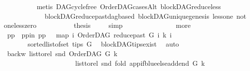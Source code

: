 \begin{isabellebody}
\ \ \ \ \ \ \ \ \isamarkupfalse%
\ {\isacharparenleft}{\kern0pt}metis\ DAG{\isachardot}{\kern0pt}cycle{\isacharunderscore}{\kern0pt}free\ OrderDAG{\isacharunderscore}{\kern0pt}casesAlt\ blockDAG{\isachardot}{\kern0pt}reduce{\isacharunderscore}{\kern0pt}less\isanewline
\ \ \ \ \ \ \ \ \ \ \ \ blockDAG{\isachardot}{\kern0pt}reduce{\isacharunderscore}{\kern0pt}past{\isacharunderscore}{\kern0pt}dagbased\ blockDAG{\isachardot}{\kern0pt}unique{\isacharunderscore}{\kern0pt}genesis\ less{\isacharunderscore}{\kern0pt}one\ not{\isacharunderscore}{\kern0pt}one{\isacharunderscore}{\kern0pt}less{\isacharunderscore}{\kern0pt}zero{\isacharparenright}{\kern0pt}\ \isanewline
\ \ \ \ \ \ \isamarkupfalse%
\ \isamarkupfalse%
\ {\isacharquery}{\kern0pt}thesis\ \isamarkupfalse%
\ {}\ \isamarkupfalse%
\ simp\isanewline
\ \ \ \ \isamarkupfalse%
\ \ \isanewline
\ \ \ \ \ \ \isamarkupfalse%
\ more\isanewline
\ \ \ \ \ \ \isamarkupfalse%
\ pp\ \ pp{\isacharunderscore}{\kern0pt}in{\isacharcolon}{\kern0pt}\ {\isachardoublequoteopen}pp\ {\isacharequal}{\kern0pt}\ \ {\isacharparenleft}{\kern0pt}map\ {\isacharparenleft}{\kern0pt}{\isasymlambda}i{\isachardot}{\kern0pt}\ {\isacharparenleft}{\kern0pt}OrderDAG\ {\isacharparenleft}{\kern0pt}reduce{\isacharunderscore}{\kern0pt}past\ G\ i{\isacharparenright}{\kern0pt}\ k{\isacharcomma}{\kern0pt}\ i{\isacharparenright}{\kern0pt}{\isacharparenright}{\kern0pt}\isanewline
\ \ \ \ \ \ \ {\isacharparenleft}{\kern0pt}sorted{\isacharunderscore}{\kern0pt}list{\isacharunderscore}{\kern0pt}of{\isacharunderscore}{\kern0pt}set\ {\isacharparenleft}{\kern0pt}tips\ G{\isacharparenright}{\kern0pt}{\isacharparenright}{\kern0pt}{\isacharparenright}{\kern0pt}{\isachardoublequoteclose}\ \isamarkupfalse%
\ blockDAG{\isachardot}{\kern0pt}tips{\isacharunderscore}{\kern0pt}exist\ \isamarkupfalse%
\ auto\isanewline
\ \ \ \ \ \ \isamarkupfalse%
\ backw{\isacharcolon}{\kern0pt}\ {\isachardoublequoteopen}list{\isacharunderscore}{\kern0pt}to{\isacharunderscore}{\kern0pt}rel\ {\isacharparenleft}{\kern0pt}snd\ {\isacharparenleft}{\kern0pt}OrderDAG\ G\ k{\isacharparenright}{\kern0pt}{\isacharparenright}{\kern0pt}\ {\isacharequal}{\kern0pt}\ \isanewline
\ \ \ \ \ \ \ \ \ \ \ \ \ \ \ \ \ \ \ \ \ list{\isacharunderscore}{\kern0pt}to{\isacharunderscore}{\kern0pt}rel\ {\isacharparenleft}{\kern0pt}snd\ {\isacharparenleft}{\kern0pt}fold\ {\isacharparenleft}{\kern0pt}app{\isacharunderscore}{\kern0pt}if{\isacharunderscore}{\kern0pt}blue{\isacharunderscore}{\kern0pt}else{\isacharunderscore}{\kern0pt}add{\isacharunderscore}{\kern0pt}end\ G\ k{\isacharparenright}{\kern0pt}\isanewline

\end{isabellebody}
